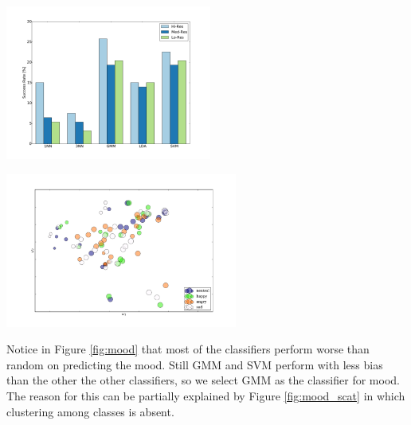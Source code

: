 \documentclass{article} %
\begin{document}
\begin{minipage}{0.45\linewidth}
	\centering
	\includegraphics[height=2in]{fig/mood.pdf}
	\label{fig:mood}
\end{minipage}
\hfill
\begin{minipage}{0.45\linewidth}
	\centering
	\includegraphics[height=2in]{fig/mood_scatter.pdf}
	\label{fig:mood_scat}
\end{minipage}

Notice in Figure \ref{fig:mood} that most of the classifiers perform worse than random on predicting the mood.  Still GMM and SVM perform with less bias than the other the other classifiers, so we select GMM as the classifier for mood.  The reason for this can be partially explained by Figure \ref{fig:mood_scat} in which clustering among classes is absent.
\end{document}
